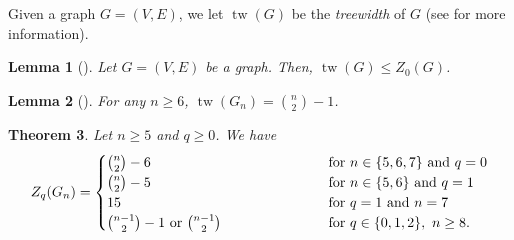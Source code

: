 \documentclass[3p,times,12pt]{article}
\newtheorem{theorem}{Theorem}[section]
\newtheorem{lemma}[theorem]{Lemma}
\DeclareMathOperator{\tw}{tw}
\begin{document}
	Given a graph $G = (V,E)$, we let $\tw(G)$ be the \emph{treewidth} of $G$ (see \cite{barioli2013parameters} for more information).
	\begin{lemma}[\cite{barioli2013parameters}]
		Let $G = (V,E)$ be a graph. Then, $\tw(G) \leq Z_0(G)$.\label{lem:tw-z0-lower-bound}
	\end{lemma}

	\begin{lemma}[\cite{harvey2014treewidth}] \label{twh}
		For any $n\geq 6$, $\tw(G_n) = \binom{n}{2}-1$.
	\end{lemma}
	
	\begin{theorem}
		Let $n\geq 5$ and $q\geq 0$. We have
		\begin{align*}
			Z_q(G_n) =
			\begin{cases}
				\binom{n}{2}-6  \hspace*{4cm} &\mbox{ for } n \in \{5,6,7\} \mbox{ and } q=0\\
				\binom{n}{2}-5 &\mbox{ for } n \in \{5,6\} \mbox{ and } q = 1\\
				15 & \mbox{ for } q = 1 \mbox{ and } n = 7\\
				 \binom{n-1}{2}-1 \mbox{ or } \binom{n-1}{2}  & \mbox{ for } q\in \{0,1,2\},\ n\geq 8.\\
			\end{cases}
		\end{align*}\label{lem:tw}
	\end{theorem}
\end{document}
